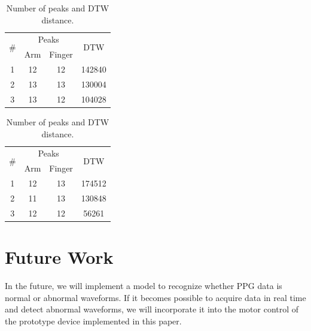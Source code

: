 \documentclass[sigconf, anonymous]{acmart}
\begin{document}
\begin{table}[!t]
    \centering
    \caption{Number of peaks and DTW distance.}
    \begin{minipage}[t]{0.48\linewidth}
        \centering
        \begin{tabular}{c|cc|c} \hline\hline
            \multirow{2}{*}{\#} & \multicolumn{2}{c|}{Peaks} & \multirow{2}{*}{DTW} \\ \cline{2-3}
             & Arm & Finger & \\ \hline
            1 & 12 & 12 & 142840 \\
            2 & 13 & 13 & 130004 \\
            3 & 13 & 12 & 104028 \\ \hline
        \end{tabular}
        \label{tab:manual}
    \end{minipage}
    \begin{minipage}[t]{0.48\linewidth}
        \centering
        \begin{tabular}{c|cc|c} \hline\hline
            \multirow{2}{*}{\#} & \multicolumn{2}{c|}{Peaks} & \multirow{2}{*}{DTW} \\ \cline{2-3}
             & Arm & Finger & \\ \hline
            1 & 12 & 13 & 174512 \\
            2 & 11 & 13 & 130848 \\
            3 & 12 & 12 & 56261 \\ \hline
        \end{tabular}
        \label{tab:auto}
    \end{minipage}
    \label{tab:result}
\end{table}



\section{Future Work}
\label{sec:future_work}
In the future, we will implement a model to recognize whether PPG data is normal or abnormal waveforms. If it becomes possible to acquire data in real time and detect abnormal waveforms, we will incorporate it into the motor control of the prototype device implemented in this paper.
\end{document}
